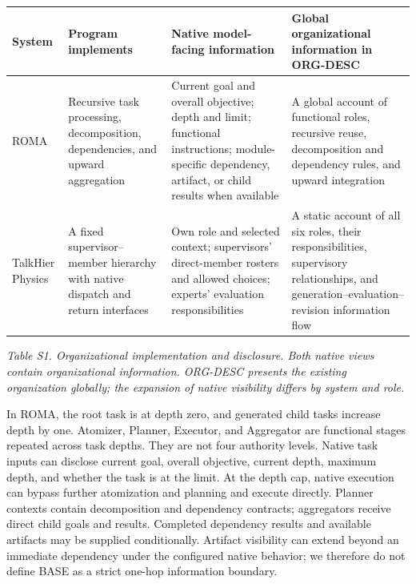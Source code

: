 \documentclass[10pt,letterpaper,twocolumn]{article}
\begin{document}
\begin{center}\small\begin{tabularx}{\linewidth}{@{}>{\raggedright\arraybackslash}X>{\raggedright\arraybackslash}X>{\raggedright\arraybackslash}X>{\raggedright\arraybackslash}X@{}}\toprule

\textbf{System} & \textbf{Program implements} & \textbf{Native model-facing information} & \textbf{Global organizational information in ORG-DESC}\\\midrule

ROMA & Recursive task processing, decomposition, dependencies, and upward aggregation & Current goal and overall objective; depth and limit; functional instructions; module-specific dependency, artifact, or child results when available & A global account of functional roles, recursive reuse, decomposition and dependency rules, and upward integration\\

TalkHier Physics & A fixed supervisor--member hierarchy with native dispatch and return interfaces & Own role and selected context; supervisors' direct-member rosters and allowed choices; experts' evaluation responsibilities & A static account of all six roles, their responsibilities, supervisory relationships, and generation--evaluation--revision information flow\\

\bottomrule\end{tabularx}\end{center}

\emph{Table S1. Organizational implementation and disclosure. Both native views contain organizational information. ORG-DESC presents the existing organization globally; the expansion of native visibility differs by system and role.}

In ROMA, the root task is at depth zero, and generated child tasks increase depth by one. Atomizer, Planner, Executor, and Aggregator are functional stages repeated across task depths. They are not four authority levels. Native task inputs can disclose current goal, overall objective, current depth, maximum depth, and whether the task is at the limit. At the depth cap, native execution can bypass further atomization and planning and execute directly. Planner contexts contain decomposition and dependency contracts; aggregators receive direct child goals and results. Completed dependency results and available artifacts may be supplied conditionally. Artifact visibility can extend beyond an immediate dependency under the configured native behavior; we therefore do not define BASE as a strict one-hop information boundary.
\end{document}
